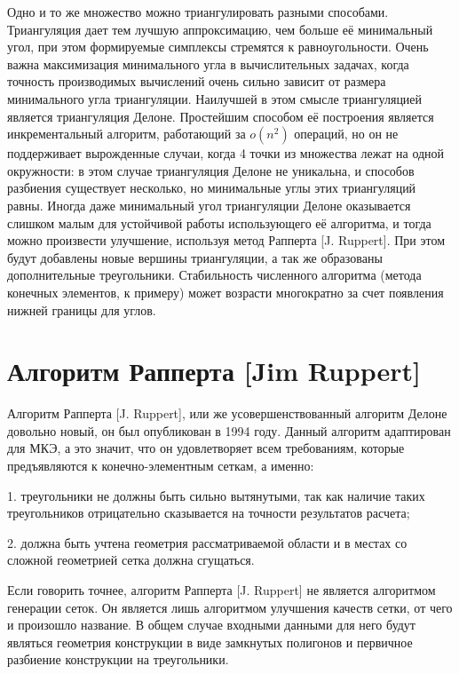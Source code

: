 \documentclass[14pt]{extreport}
\begin{document}
Одно и то же множество можно триангулировать разными способами. Триангуляция дает тем лучшую аппроксимацию, чем больше её минимальный угол, при этом формируемые симплексы стремятся к равноугольности. Очень важна максимизация минимального угла в вычислительных задачах, когда точность производимых вычислений очень сильно зависит от размера минимального угла триангуляции. Наилучшей в этом смысле триангуляцией является триангуляция Делоне. Простейшим способом её построения является инкрементальный алгоритм, работающий за $o(n^2)$ операций, но он не поддерживает вырожденные случаи, когда 4 точки из множества лежат на одной окружности: в этом случае триангуляция Делоне не уникальна, и способов разбиения существует несколько, но минимальные углы этих триангуляций равны. Иногда даже минимальный угол триангуляции Делоне оказывается слишком малым для устойчивой работы использующего её алгоритма, и тогда можно произвести улучшение, используя метод Рапперта [J. Ruppert]. При этом будут добавлены новые вершины триангуляции, а так же образованы дополнительные треугольники. Стабильность численного алгоритма (метода конечных элементов, к примеру) может возрасти многократно за счет появления нижней границы для углов. 

\section{Алгоритм Рапперта [Jim Ruppert]}

Алгоритм Рапперта [J. Ruppert], или же усовершенствованный алгоритм Делоне довольно новый, он был опубликован в 1994 году. Данный алгоритм адаптирован для МКЭ, а это значит, что он удовлетворяет всем требованиям, которые предъявляются к конечно-элементным сеткам, а именно:

1. треугольники не должны быть сильно вытянутыми, так как наличие таких треугольников отрицательно сказывается на точности результатов расчета;

2. должна быть учтена геометрия рассматриваемой области и в местах со сложной геометрией сетка должна сгущаться.


Если говорить точнее, алгоритм Рапперта [J. Ruppert] не является алгоритмом генерации сеток. Он является лишь алгоритмом улучшения качеств сетки, от чего и произошло название. В общем случае входными данными для него будут являться геометрия конструкции в виде замкнутых полигонов и первичное разбиение конструкции на треугольники. 
\end{document}
